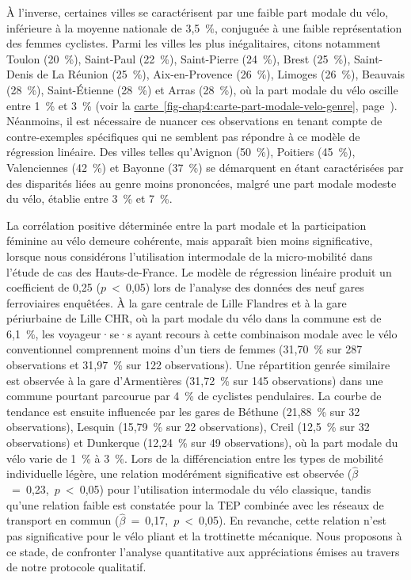 \begin{refsegment}
À l'inverse, certaines villes se caractérisent par une faible part modale du vélo, inférieure à la moyenne nationale de 3,5~\%, conjuguée à une faible représentation des femmes cyclistes. Parmi les villes les plus inégalitaires, citons notamment Toulon (20~\%), Saint-Paul (22~\%), Saint-Pierre (24~\%), Brest (25~\%), Saint-Denis de La Réunion (25~\%), Aix-en-Provence (26~\%), Limoges (26~\%), Beauvais (28~\%), Saint-Étienne (28~\%) et Arras (28~\%), où la part modale du vélo oscille entre 1~\% et 3~\% (voir la \hyperref[fig-chap4:carte-part-modale-velo-genre]{carte~\ref{fig-chap4:carte-part-modale-velo-genre}}, page~\pageref{fig-chap4:carte-part-modale-velo-genre}). Néanmoins, il est nécessaire de nuancer ces observations en tenant compte de contre-exemples spécifiques qui ne semblent pas répondre à ce modèle de régression linéaire. Des villes telles qu'Avignon (50~\%), Poitiers (45~\%), Valenciennes (42~\%) et Bayonne (37~\%) se démarquent en étant caractérisées par des disparités liées au genre moins prononcées, malgré une part modale modeste du vélo, établie entre 3~\% et 7~\%.%

La corrélation positive déterminée entre la part modale et la participation féminine au vélo demeure cohérente, mais apparaît bien moins significative, lorsque nous considérons l'utilisation intermodale de la micro-mobilité dans l'étude de cas des Hauts-de-France. Le modèle de régression linéaire produit un coefficient de 0,25 ($p$~\textless~0,05) lors de l'analyse des données des neuf gares ferroviaires enquêtées. À la gare centrale de Lille Flandres et à la gare périurbaine de Lille CHR, où la part modale du vélo dans la commune est de 6,1~\%, les voyageur·se·s ayant recours à cette combinaison modale avec le vélo conventionnel comprennent moins d'un tiers de femmes (31,70~\% sur 287 observations et 31,97~\% sur 122 observations). Une répartition genrée similaire est observée à la gare d'Armentières (31,72~\% sur 145 observations) dans une commune pourtant parcourue par 4~\% de cyclistes pendulaires. La courbe de tendance est ensuite influencée par les gares de Béthune (21,88~\% sur 32 observations), Lesquin (15,79~\% sur 22 observations), Creil (12,5~\% sur 32 observations) et Dunkerque (12,24~\% sur 49 observations), où la part modale du vélo varie de 1~\% à 3~\%. Lors de la différenciation entre les types de mobilité individuelle légère, une relation modérément significative est observée ($\hat{\beta}$~=~0,23,~$p$~\textless~0,05) pour l'utilisation intermodale du vélo classique, tandis qu'une relation faible est constatée pour la \acrshort{TEP} combinée avec les réseaux de transport en commun ($\hat{\beta}$~=~0,17,~$p$~\textless~0,05). En revanche, cette relation n'est pas significative pour le vélo pliant et la trottinette mécanique. Nous proposons à ce stade, de confronter l'analyse quantitative aux appréciations émises au travers de notre protocole qualitatif.%


\end{refsegment}
